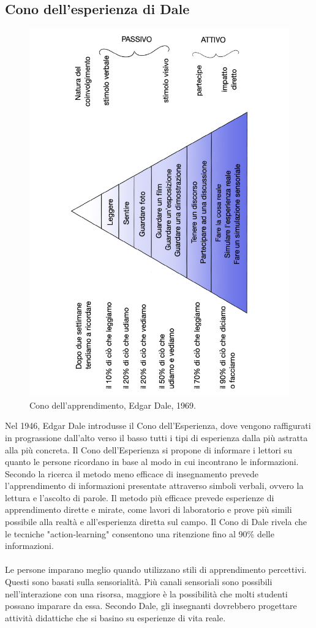\subsection{Cono dell'esperienza di Dale}

\begin{figure}[h!]
  \centerline{\includegraphics[height = 12 cm, width= 8 cm, angle=270]{figures/cono.pdf}}
  \caption{Cono dell'apprendimento, Edgar Dale, 1969.}
\end{figure}
Nel 1946, Edgar Dale introdusse il Cono dell'Esperienza, dove vengono raffigurati in prograssione dall'alto verso il basso tutti i tipi di esperienza dalla più astratta alla più concreta. Il Cono dell'Esperienza si propone di informare i lettori su quanto le persone ricordano in base al modo in cui incontrano le informazioni. Secondo la ricerca il metodo meno efficace di insegnamento prevede l'apprendimento di informazioni presentate attraverso simboli verbali, ovvero la lettura e l'ascolto di parole. Il metodo più efficace prevede esperienze di apprendimento dirette e mirate, come lavori di laboratorio e prove più simili possibile alla realtà e all'esperienza diretta sul campo. Il Cono di Dale rivela che le tecniche "action-learning" consentono una ritenzione fino al 90\% delle informazioni.\\
\\
Le persone imparano meglio quando utilizzano stili di apprendimento percettivi. Questi sono basati sulla sensorialità. Più canali sensoriali sono possibili nell'interazione con una risorsa, maggiore è la possibilità che molti studenti possano imparare da essa. Secondo Dale, gli insegnanti dovrebbero progettare attività didattiche che si basino su esperienze di vita reale.
